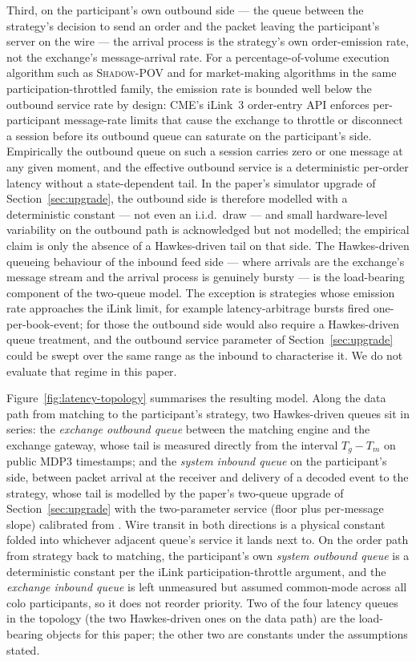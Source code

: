 \documentclass[11pt]{article}
\newcommand{\shadowpov}{\textsc{Shadow-POV}}
\begin{document}
Third, on the participant's own outbound side --- the queue between the strategy's decision to send an order and the packet leaving the participant's server on the wire --- the arrival process is the strategy's own order-emission rate, not the exchange's message-arrival rate. For a percentage-of-volume execution algorithm such as \shadowpov{} and for market-making algorithms in the same participation-throttled family, the emission rate is bounded well below the outbound service rate by design: CME's iLink~3 order-entry API enforces per-participant message-rate limits that cause the exchange to throttle or disconnect a session before its outbound queue can saturate on the participant's side. Empirically the outbound queue on such a session carries zero or one message at any given moment, and the effective outbound service is a deterministic per-order latency without a state-dependent tail. In the paper's simulator upgrade of Section~\ref{sec:upgrade}, the outbound side is therefore modelled with a deterministic constant --- not even an i.i.d.\ draw --- and small hardware-level variability on the outbound path is acknowledged but not modelled; the empirical claim is only the absence of a Hawkes-driven tail on that side. The Hawkes-driven queueing behaviour of the inbound feed side --- where arrivals are the exchange's message stream and the arrival process is genuinely bursty --- is the load-bearing component of the two-queue model. The exception is strategies whose emission rate approaches the iLink limit, for example latency-arbitrage bursts fired one-per-book-event; for those the outbound side would also require a Hawkes-driven queue treatment, and the outbound service parameter of Section~\ref{sec:upgrade} could be swept over the same range as the inbound to characterise it. We do not evaluate that regime in this paper.

Figure~\ref{fig:latency-topology} summarises the resulting model. Along the data path from matching to the participant's strategy, two Hawkes-driven queues sit in series: the \emph{exchange outbound queue} between the matching engine and the exchange gateway, whose tail is measured directly from the interval $T_g - T_m$ on public MDP3 timestamps; and the \emph{system inbound queue} on the participant's side, between packet arrival at the receiver and delivery of a decoded event to the strategy, whose tail is modelled by the paper's two-queue upgrade of Section~\ref{sec:upgrade} with the two-parameter service (floor plus per-message slope) calibrated from \citet{mayeski_actorhft}. Wire transit in both directions is a physical constant folded into whichever adjacent queue's service it lands next to. On the order path from strategy back to matching, the participant's own \emph{system outbound queue} is a deterministic constant per the iLink participation-throttle argument, and the \emph{exchange inbound queue} is left unmeasured but assumed common-mode across all colo participants, so it does not reorder priority. Two of the four latency queues in the topology (the two Hawkes-driven ones on the data path) are the load-bearing objects for this paper; the other two are constants under the assumptions stated.
\end{document}
